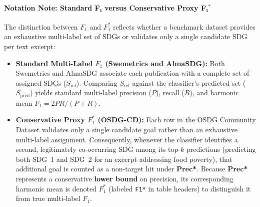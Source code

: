 \paragraph{Notation Note: Standard F₁ versus Conservative Proxy F₁\texorpdfstring{$^{*}$}{*}}
The distinction between $F_1$ and $F_1^*$ reflects whether a benchmark dataset provides an exhaustive multi-label set of \glspl{SDG} or validates only a single candidate \gls{SDG} per text excerpt:
\begin{itemize}
  \item \textbf{Standard Multi-Label $F_1$ (Swemetrics and AlmaSDG):} Both Swemetrics and AlmaSDG associate each publication with a complete set of assigned \glspl{SDG} ($S_{\text{ref}}$). Comparing $S_{\text{ref}}$ against the classifier's predicted set ($S_{\text{pred}}$) yields standard multi-label precision ($P$), recall ($R$), and harmonic mean $F_1 = 2PR / (P + R)$.
  
  \item \textbf{Conservative Proxy $F_1^*$ (OSDG-CD):} Each row in the OSDG Community Dataset validates only a single candidate goal rather than an exhaustive multi-label assignment. Consequently, whenever the classifier identifies a second, legitimately co-occurring \gls{SDG} among its top-$k$ predictions (\eg predicting both \gls{SDG}~1 and \gls{SDG}~2 for an excerpt addressing food poverty), that additional goal is counted as a non-target hit under \textbf{Prec*}. Because \textbf{Prec*} represents a conservative \textbf{lower bound} on precision, its corresponding harmonic mean is denoted $F_1^*$ (labeled \texttt{F1*} in table headers) to distinguish it from true multi-label $F_1$.
\end{itemize}

\clearpage



\printglossary[style=mylong, type=\acronymtype, title={List of Acronyms and Abbreviations}]

